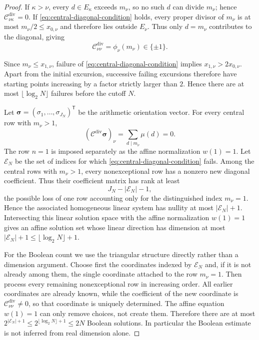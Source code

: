 \documentclass[11pt]{amsart}
\numberwithin{equation}{section}
\theoremstyle{plain}
\theoremstyle{definition}
\theoremstyle{remark}
\begin{document}
\begin{proof}
If $\kappa>\nu$, every $d\in E_\kappa$ exceeds $m_\nu$, so no such $d$ can
divide $m_\nu$; hence $\mathscr C^{\mathrm{div}}_{\nu\kappa}=0$.  If
\eqref{eq:central-diagonal-condition} holds, every proper divisor of
$m_\nu$ is at most $m_\nu/2\le x_{0,\nu}$ and therefore lies outside
$E_\nu$.  Thus only $d=m_\nu$ contributes to the diagonal, giving
\[
\mathscr C^{\mathrm{div}}_{\nu\nu}=\phi_\nu(m_\nu)\in\{\pm1\}.
\]

Since $m_\nu\le x_{1,\nu}$, failure of
\eqref{eq:central-diagonal-condition} implies
$x_{1,\nu}>2x_{0,\nu}$.  Apart from the initial excursion, successive
failing excursions therefore have starting points increasing by a factor
strictly larger than $2$.  Hence there are at most
$\lfloor\log_2N\rfloor$ failures before the cutoff $N$.

Let $\boldsymbol\sigma=(\sigma_1,\dots,\sigma_{J_N})^{\mathsf T}$ be the
arithmetic orientation vector.  For every central row with $m_\nu>1$,
\[
(\mathscr C^{\mathrm{div}}\boldsymbol\sigma)_\nu
=
\sum_{d\mid m_\nu}\mu(d)=0.
\]
The row $n=1$ is imposed separately as the affine normalization $w(1)=1$.
Let $\mathcal E_N$ be the set of indices for which
\eqref{eq:central-diagonal-condition} fails.  Among the central rows with
$m_\nu>1$, every nonexceptional row has a nonzero new diagonal coefficient.
Thus their coefficient matrix has rank at least
\[
J_N-|\mathcal E_N|-1,
\]
the possible loss of one row accounting only for the distinguished index
$m_\nu=1$.  Hence the associated homogeneous linear system has nullity at
most $|\mathcal E_N|+1$.  Intersecting this linear solution space with the
affine normalization $w(1)=1$ gives an affine solution set whose linear
direction has dimension at most $|\mathcal E_N|+1\le
\lfloor\log_2N\rfloor+1$.

For the Boolean count we use the triangular structure directly rather than a
dimension argument.  Choose first the coordinates indexed by $\mathcal E_N$
and, if it is not already among them, the single coordinate attached to the
row $m_\nu=1$.  Then process every remaining nonexceptional row in increasing
order.  All earlier coordinates are already known, while the coefficient of
the new coordinate is $\mathscr C^{\mathrm{div}}_{\nu\nu}\ne0$, so that
coordinate is uniquely determined.  The affine equation $w(1)=1$ can only
remove choices, not create them.  Therefore there are at most
$2^{|\mathcal E_N|+1}\le2^{\lfloor\log_2N\rfloor+1}\le2N$ Boolean
solutions.  In particular the Boolean estimate is not inferred from real
dimension alone.


\end{proof}
\end{document}
